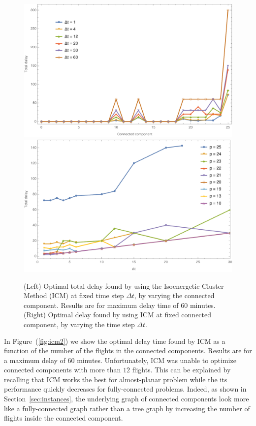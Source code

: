 \begin{figure}
  \includegraphics[width=\columnwidth]{pics/qubo_icm/qubo_icm_3.pdf}
  \includegraphics[width=\columnwidth]{pics/qubo_icm/qubo_icm_4.pdf}
  \caption{(Left) Optimal total delay found by using the
  Isoenergetic Cluster Method (ICM) at fixed time step $\Delta t$, by varying
  the connected component. Results are for maximum delay time of $60$ minutes. (Right)
  Optimal delay found by using ICM at fixed connected component, by varying the time step
  $\Delta t$.}
\label{fig:icm1}
\end{figure}

In Figure~(\ref{fig:icm2}) we show the optimal delay time found by ICM as a
function of the number of the flights in the connected components. Results are
for a maximum delay of 60 minutes. Unfortunately, ICM was unable to optimize
connected components with more than $12$ flights. This can be explained by
recalling that ICM works the best for almost-planar problem while the
its performance quickly decreases for fully-connected problems. Indeed, as shown
in Section~\ref{sec:instances}, the underlying graph of connected components
look more like a fully-connected graph rather than a tree graph by increasing
the number of flights inside the connected component.

